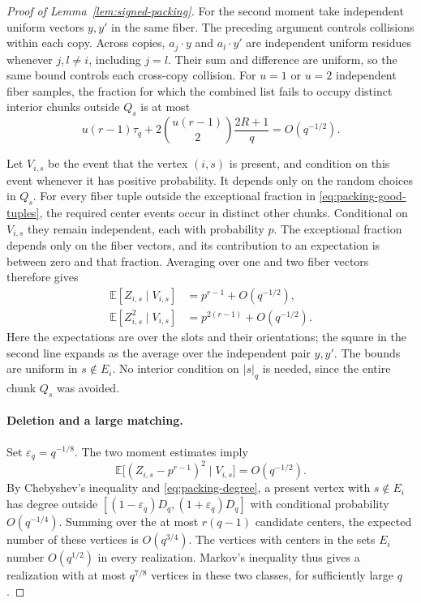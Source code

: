 \begin{proof}[Proof of Lemma~\ref{lem:signed-packing}]
For the second moment take independent uniform vectors $y,y'$ in the
same fiber.  The preceding argument controls collisions within each
copy.  Across copies, $a_j\cdot y$ and $a_l\cdot y'$ are independent
uniform residues whenever $j,l\ne i$, including $j=l$.  Their sum and
difference are uniform, so the same bound controls each cross-copy
collision.  For $u=1$ or $u=2$ independent fiber samples, the fraction
for which the combined list fails to occupy distinct interior chunks
outside $Q_s$ is at most
\begin{equation}
 u(r-1)\tau_q+
 2\binom{u(r-1)}2\frac{2R+1}{q}=O(q^{-1/2}).
 \label{eq:packing-good-tuples}
\end{equation}

Let $V_{i,s}$ be the event that the vertex $(i,s)$ is present, and
condition on this event whenever it has positive probability.  It
depends only on the random choices in $Q_s$.  For every fiber tuple
outside the exceptional fraction in \eqref{eq:packing-good-tuples},
the required center events occur in distinct other chunks.  Conditional
on $V_{i,s}$ they remain independent, each with probability $p$.
The exceptional fraction depends only on the fiber vectors, and its
contribution to an expectation is between zero and that fraction.
Averaging over one and two fiber vectors therefore gives
\begin{align}
 \mathbb E[Z_{i,s}\mid V_{i,s}]&=p^{r-1}+O(q^{-1/2}),
 \label{eq:packing-first-moment}\\
 \mathbb E[Z_{i,s}^2\mid V_{i,s}]&=p^{2(r-1)}+O(q^{-1/2}).
 \label{eq:packing-second-moment}
\end{align}
Here the expectations are over the slots and their orientations; the
square in the second line expands as the average over the independent
pair $y,y'$.  The bounds are uniform in $s\notin E_i$.  No interior
condition on $|s|_q$ is needed, since the entire chunk $Q_s$ was avoided.

\paragraph{Deletion and a large matching.}
Set $\varepsilon_q=q^{-1/8}$.  The two moment estimates imply
\[
 \mathbb E\bigl[(Z_{i,s}-p^{r-1})^2\mid V_{i,s}\bigr]
 =O(q^{-1/2}).
\]
By Chebyshev's inequality and \eqref{eq:packing-degree}, a present
vertex with $s\notin E_i$ has degree outside
$[(1-\varepsilon_q)D_q,(1+\varepsilon_q)D_q]$ with conditional
probability $O(q^{-1/4})$.  Summing over the at most $r(q-1)$ candidate
centers, the expected number of these vertices is $O(q^{3/4})$.
The vertices with centers in the sets $E_i$ number $O(q^{1/2})$ in
every realization.  Markov's inequality thus gives a realization with
at most $q^{7/8}$ vertices in these two classes, for sufficiently large
$q$.


\end{proof}
